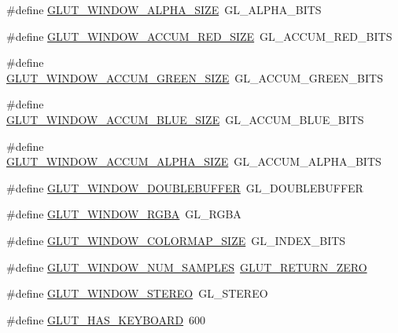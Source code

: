 \begin{DoxyCompactItemize}
\#define \hyperlink{glut_8_h_a57d82d9d76b5c6f5f8e7d3466609399e}{G\+L\+U\+T\+\_\+\+W\+I\+N\+D\+O\+W\+\_\+\+A\+L\+P\+H\+A\+\_\+\+S\+I\+ZE}~G\+L\+\_\+\+A\+L\+P\+H\+A\+\_\+\+B\+I\+TS
\item 
\#define \hyperlink{glut_8_h_a2110a2aecd5d4ad7a104a0b9477a3629}{G\+L\+U\+T\+\_\+\+W\+I\+N\+D\+O\+W\+\_\+\+A\+C\+C\+U\+M\+\_\+\+R\+E\+D\+\_\+\+S\+I\+ZE}~G\+L\+\_\+\+A\+C\+C\+U\+M\+\_\+\+R\+E\+D\+\_\+\+B\+I\+TS
\item 
\#define \hyperlink{glut_8_h_aafbd9803c6c09cefc820bc0d9646c4a4}{G\+L\+U\+T\+\_\+\+W\+I\+N\+D\+O\+W\+\_\+\+A\+C\+C\+U\+M\+\_\+\+G\+R\+E\+E\+N\+\_\+\+S\+I\+ZE}~G\+L\+\_\+\+A\+C\+C\+U\+M\+\_\+\+G\+R\+E\+E\+N\+\_\+\+B\+I\+TS
\item 
\#define \hyperlink{glut_8_h_a74844f3c9ea2afa20a81638a45049ad9}{G\+L\+U\+T\+\_\+\+W\+I\+N\+D\+O\+W\+\_\+\+A\+C\+C\+U\+M\+\_\+\+B\+L\+U\+E\+\_\+\+S\+I\+ZE}~G\+L\+\_\+\+A\+C\+C\+U\+M\+\_\+\+B\+L\+U\+E\+\_\+\+B\+I\+TS
\item 
\#define \hyperlink{glut_8_h_a253794e453f452508d170c62ac34e638}{G\+L\+U\+T\+\_\+\+W\+I\+N\+D\+O\+W\+\_\+\+A\+C\+C\+U\+M\+\_\+\+A\+L\+P\+H\+A\+\_\+\+S\+I\+ZE}~G\+L\+\_\+\+A\+C\+C\+U\+M\+\_\+\+A\+L\+P\+H\+A\+\_\+\+B\+I\+TS
\item 
\#define \hyperlink{glut_8_h_a9209d34d3fb3805e395878acd78e2f02}{G\+L\+U\+T\+\_\+\+W\+I\+N\+D\+O\+W\+\_\+\+D\+O\+U\+B\+L\+E\+B\+U\+F\+F\+ER}~G\+L\+\_\+\+D\+O\+U\+B\+L\+E\+B\+U\+F\+F\+ER
\item 
\#define \hyperlink{glut_8_h_a3b538c911c396c95b24c4a59be27ab3b}{G\+L\+U\+T\+\_\+\+W\+I\+N\+D\+O\+W\+\_\+\+R\+G\+BA}~G\+L\+\_\+\+R\+G\+BA
\item 
\#define \hyperlink{glut_8_h_a02eae1e68c788e930924f1b1f36f5169}{G\+L\+U\+T\+\_\+\+W\+I\+N\+D\+O\+W\+\_\+\+C\+O\+L\+O\+R\+M\+A\+P\+\_\+\+S\+I\+ZE}~G\+L\+\_\+\+I\+N\+D\+E\+X\+\_\+\+B\+I\+TS
\item 
\#define \hyperlink{glut_8_h_ab45baab849e18a8dc86cb230d8582436}{G\+L\+U\+T\+\_\+\+W\+I\+N\+D\+O\+W\+\_\+\+N\+U\+M\+\_\+\+S\+A\+M\+P\+L\+ES}~\hyperlink{glut_8_h_a0944a4353780132eeab7b06e3e42291dae9a1cdeb1b0b1804ae7e3c0ca5576952}{G\+L\+U\+T\+\_\+\+R\+E\+T\+U\+R\+N\+\_\+\+Z\+E\+RO}
\item 
\#define \hyperlink{glut_8_h_a37c7f9ceeb75ab4f4a02da02b0f50d4b}{G\+L\+U\+T\+\_\+\+W\+I\+N\+D\+O\+W\+\_\+\+S\+T\+E\+R\+EO}~G\+L\+\_\+\+S\+T\+E\+R\+EO
\item 
\#define \hyperlink{glut_8_h_afc9f178dce8da5d750839f8607986706}{G\+L\+U\+T\+\_\+\+H\+A\+S\+\_\+\+K\+E\+Y\+B\+O\+A\+RD}~600
\item 

\end{DoxyCompactItemize}

